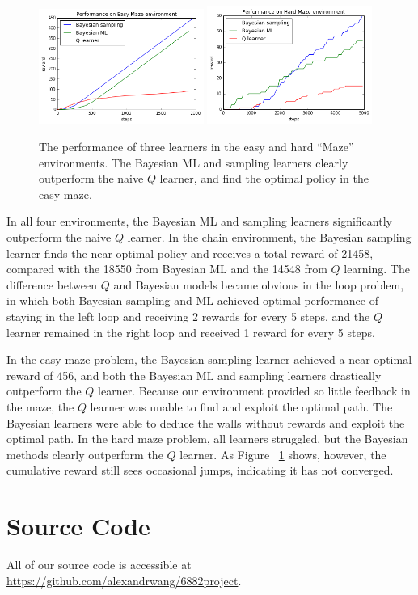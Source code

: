 \documentclass[10pt, twocolumn, twoside]{article}
\begin{document}
\begin{figure}
\centering
\includegraphics[width=0.48\textwidth]{smallMazePerf.png}
\includegraphics[width=0.48\textwidth]{largeMazePerf.png}
\caption{\label{fig:easyhardPerf} The performance of three learners in the easy and hard ``Maze''
environments. The Bayesian ML and sampling learners clearly outperform the naive $Q$ learner, and
find the optimal policy in the easy maze.}
\end{figure}

In all four environments, the Bayesian ML and sampling learners significantly outperform the naive
$Q$ learner. In the chain environment, the Bayesian sampling learner finds the near-optimal policy and
receives a total reward of 21458, compared with the 18550 from Bayesian ML and the 14548 from $Q$ learning.
The difference between $Q$ and Bayesian models became obvious in the loop problem, in which both Bayesian
sampling and ML achieved optimal performance of staying in the left loop and receiving 2 rewards for every
5 steps, and the $Q$ learner remained in the right loop and received 1 reward for every 5 steps.

In the easy maze problem, the Bayesian sampling learner achieved a near-optimal reward of 456, and both the
Bayesian ML and sampling learners drastically outperform the $Q$ learner. Because our environment provided
so little feedback in the maze, the $Q$ learner was unable to find and exploit the optimal path. The Bayesian
learners were able to deduce the walls without rewards and exploit the optimal path. In the hard maze problem,
all learners struggled, but the Bayesian methods clearly outperform the $Q$ learner. As Figure ~\ref{fig:easyhardPerf}
shows, however, the cumulative reward still sees occasional jumps, indicating it has not converged.

\section{Source Code}
All of our source code is accessible at \url{https://github.com/alexandrwang/6882project}.



\end{document}
